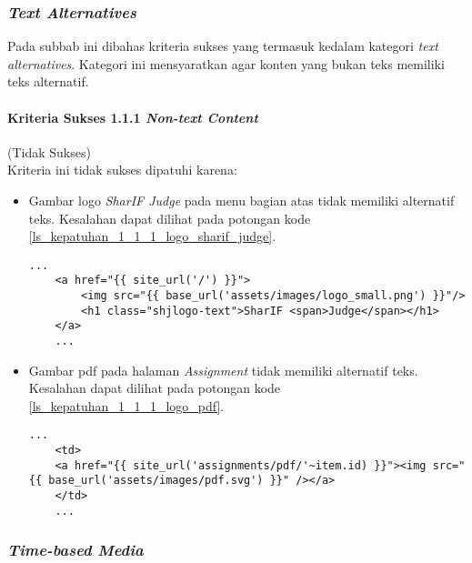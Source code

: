 \subsubsection{\textit{Text Alternatives}}
\label{subsubsec:text_alternatives}

Pada subbab ini dibahas kriteria sukses yang termasuk kedalam kategori \textit{text alternatives}. Kategori ini mensyaratkan agar konten yang bukan teks memiliki teks alternatif.

\paragraph{Kriteria Sukses 1.1.1 \textit{Non-text Content}}
\label{subsubsec:kepatuhan_kriteria_1.1.1}
(Tidak Sukses) \\

Kriteria ini tidak sukses dipatuhi karena:
\begin{itemize}
	\item Gambar logo \textit{SharIF Judge} pada menu bagian atas tidak memiliki alternatif teks. Kesalahan dapat dilihat pada potongan kode \ref{ls_kepatuhan_1_1_1_logo_sharif_judge}.
	\begin{lstlisting}[basicstyle=\ttfamily, frame=single,
	columns=fullflexible, keepspaces=true, breaklines=true, label=ls_kepatuhan_1_1_1_logo_sharif_judge, caption=Pelanggaran Kriteria Sukses 1.1.1 - Logo \textit{SharIF Judge} Tidak Diberi Alternatif Teks]
	...
	<a href="{{ site_url('/') }}">
		<img src="{{ base_url('assets/images/logo_small.png') }}"/>
		<h1 class="shjlogo-text">SharIF <span>Judge</span></h1>
	</a>
	...
	\end{lstlisting}
	\item Gambar pdf pada halaman \textit{Assignment} tidak memiliki alternatif teks. Kesalahan dapat dilihat pada potongan kode \ref{ls_kepatuhan_1_1_1_logo_pdf}.
	\begin{lstlisting}[basicstyle=\ttfamily, frame=single,
	columns=fullflexible, keepspaces=true, breaklines=true, label=ls_kepatuhan_1_1_1_logo_pdf, caption=Pelanggaran Kriteria Sukses 1.1.1 - Gambar PDF Tidak Diberi Alternatif Teks]
	...
	<td>
	<a href="{{ site_url('assignments/pdf/'~item.id) }}"><img src="{{ base_url('assets/images/pdf.svg') }}" /></a>
	</td>
	...
	\end{lstlisting}
\end{itemize}

\subsubsection{\textit{Time-based Media}}
\label{subsubsec:time-based_media}


